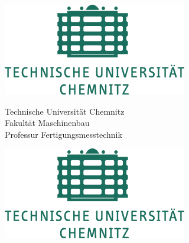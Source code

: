 \begin{titlepage}
	
\begin{figure}[htbp]
	\begin{minipage}{0.19\textwidth}
		\includegraphics[width=\textwidth]{img/logo_tuc.pdf}
	\end{minipage}
	\hfill
	\begin{minipage}{0.6\textwidth} 
		\begin{center}	
			Technische Universität Chemnitz\\
			Fakultät Maschinenbau\\
			Professur Fertigungsmesstechnik
		\end{center}
	\end{minipage}
	\hfill
	\begin{minipage}{0.19\textwidth} 
		\includegraphics[width=\textwidth]{img/logo_tuc.pdf}
	\end{minipage}
\end{figure}
	
	
	\vspace*{1cm}
		

\end{titlepage}
